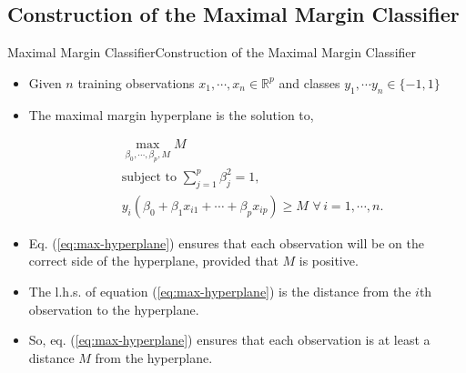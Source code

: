 \subsection{Construction of the Maximal Margin Classifier}
\begin{frame}{Maximal Margin Classifier}{Construction of the Maximal Margin Classifier}

\begin{itemize}
    \item Given $n$ training observations $x_1, \cdots , x_n \in \mathbb{R}^p$ and classes $y_1, \cdots y_n \in \{ -1,1 \}$ \pause 

    \item The maximal margin hyperplane
is the solution to, \pause 

    \begin{align}
        & \max_{\beta_0, \cdots, \beta_p, M} M  \label{eq:maximize} \\
        & \text{subject to } \sum_{j=1}^p \beta_j^2 = 1, \label{eq:restriction} \\ 
        & y_i (\beta_0 + \beta_1 x_{i1} +\cdots + \beta_{p} x_{ip} )  \geq M \, \, \forall \, i = 1, \cdots, n. \label{eq:max-hyperplane}
    \end{align}\pause 

    \item Eq. (\ref{eq:max-hyperplane}) ensures that each observation will be on the correct side of the hyperplane, provided that $M$ is positive. \pause

    \item The l.h.s. of equation (\ref{eq:max-hyperplane}) is the distance from the $i$th observation to the hyperplane. \pause 

    \item So, eq. (\ref{eq:max-hyperplane}) ensures that each observation is at least a distance $M$ from the hyperplane.

\end{itemize}

    
\end{frame}


